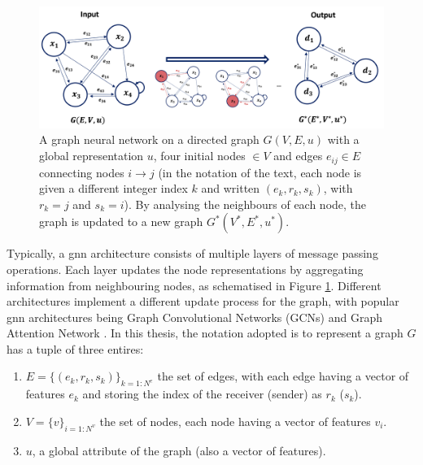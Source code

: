 \begin{figure}[h!]
    \center
    \includegraphics[scale=0.5]{Images/ML/gnn.png}
    \caption{A graph neural network on a directed graph $G(V, E, u)$ with a global representation $u$, four initial nodes $\in V$ and edges $e_{ij} \in E$ connecting nodes $i \rightarrow j$ (in the notation of the text, each node is given a different integer index $k$ and written $(e_k, r_k, s_k)$, with $r_k = j$ and $s_k = i$). By analysing the neighbours of each node, the graph is updated to a new graph $G^*(V^*, E^*, u^*)$.} 
    \label{fig:gnnScheme}
\end{figure}

Typically, a \gls{gnn} architecture consists of multiple layers of message passing operations. Each layer updates the node representations by aggregating information from neighbouring nodes, as schematised in Figure \ref{fig:gnnScheme}. Different architectures implement a different update process for the graph, with popular \gls{gnn} architectures being Graph Convolutional Networks (GCNs) \cite{gcnPaper} and Graph Attention Network \cite{velickovic2018graph}. In this thesis, the notation adopted is to represent a graph $G$ has a tuple of three entires:
\begin{enumerate}
    \item $E = \{(e_k, r_k, s_k)\}_{k=1:N^e}$ the set of edges, with each edge having a vector of features $e_k$ and storing the index of the receiver (sender) as $r_k$ ($s_k$).
    \item $V = \{v\}_{i=1:N^v}$ the set of nodes, each node having a vector of features $v_i$.
    \item $u$, a global attribute of the graph (also a vector of features). 
\end{enumerate}

